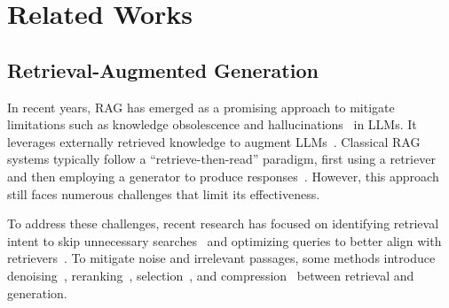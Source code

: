 \documentclass[11pt]{article}
\begin{document}
\section{Related Works}
\subsection{Retrieval-Augmented Generation}



In recent years, RAG has emerged as a promising approach to mitigate limitations such as knowledge obsolescence and hallucinations~\citep{bechard2024reducing,gade2025s} in LLMs. It leverages externally retrieved knowledge to augment LLMs~\citep{lewis2020retrieval,zhao2024retrieval1,fan2024survey,li2025matching}.
Classical RAG systems typically follow a ``retrieve-then-read'' paradigm, first using a retriever and then employing a generator to produce responses~\citep{lewis2020retrieval}. However, this approach still faces numerous challenges that limit its effectiveness.

To address these challenges, recent research has focused on identifying retrieval intent to skip unnecessary searches~\citep{jeong2024adaptive,cheng2024unified,wang2023self} and optimizing queries to better align with retrievers~\citep{ma2023query,xu2024search,jiang2025qagent}. To mitigate noise and irrelevant passages, some methods introduce denoising~\citep{wei2025instructrag}, reranking~\citep{glass2022re2g}, selection~\citep{jiang2025gainrag,lee2025shifting,wang2025optimal}, and compression~\citep{xu2024recomp} between retrieval and generation.
\end{document}
